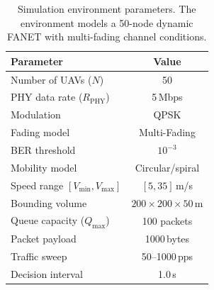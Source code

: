 \begin{table}[t]
    \centering
    \caption{Simulation environment parameters. The environment models a 50-node dynamic FANET with multi-fading channel conditions.}
    \label{tab:sim_params}
    \begin{tabular}{@{}lc@{}}
        \toprule
        \textbf{Parameter} & \textbf{Value} \\
        \midrule
        Number of UAVs ($N$) & 50 \\
        PHY data rate ($R_{\text{PHY}}$) & 5\,Mbps \\
        Modulation & QPSK \\
        Fading model & Multi-Fading \\
        BER threshold & $10^{-3}$ \\
        Mobility model & Circular/spiral \\
        Speed range $[V_{\min}, V_{\max}]$ & $[5, 35]$\,m/s \\
        Bounding volume & $200 \times 200 \times 50$\,m \\
        Queue capacity ($Q_{\max}$) & 100 packets \\
        Packet payload & 1000\,bytes \\
        Traffic sweep & 50--1000\,pps \\
        Decision interval & 1.0\,s \\
        \bottomrule
    \end{tabular}
\end{table}
